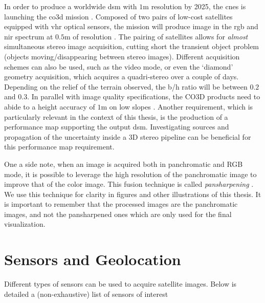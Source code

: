 In order to produce a worldwide \acrshort{dsm} with $1$m resolution by 2025, the \acrfull{cnes} is launching the \acrfull{co3d} mission \cite{melet_co3d_2020}. Composed of two pairs of low-cost satellites equipped with \acrshort{vhr} optical sensors, the mission will produce image in the \acrshort{rgb} and \acrshort{nir} spectrum at $0.5$m of resolution \cite{lebegue_co3d_2020}. The pairing of satellites allows for \textit{almost} simultaneous stereo image acquisition, cutting short the transient object problem (\ie objects moving/disappearing between stereo images). Different acquisition schemes can also be used, such as the video mode, or even the `diamond' geometry acquisition, which acquires a quadri-stereo over a couple of days. Depending on the relief of the terrain observed, the \acrshort{b/h} ratio will be between $0.2$ and $0.3$. In parallel with image quality specifications, the CO3D products need to abide to a height accuracy of $1$m on low slopes . Another requirement, which is particularly relevant in the context of this thesis, is the production of a performance map supporting the output \acrshort{dsm}. Investigating sources and propagation of the uncertainty inside a 3D stereo pipeline can be beneficial for this performance map requirement. 



One a side note, when an image is acquired both in panchromatic and RGB mode, it is possible to leverage the high resolution of the panchromatic image to improve that of the color image. This fusion technique is called \textit{pansharpening} \cite{loncan_hyperspectral_2015}. We use this technique for clarity in figures and other illustrations of this thesis. It is important to remember that the processed images are the panchromatic images, and not the pansharpened ones which are only used for the final visualization.

\section{Sensors and Geolocation}\label{sec:sensors_rpc}
Different types of sensors can be used to acquire satellite images. Below is detailed a (non-exhaustive) list of sensors of interest \cite{cnes_imagerie_2008}

